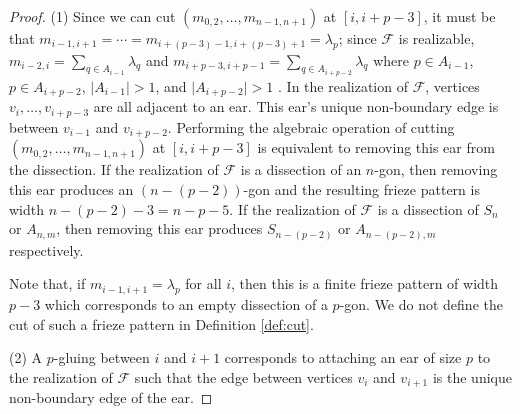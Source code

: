 \documentclass[12pt]{article}
\theoremstyle{remark}
\begin{document}
\begin{proof}
(1) Since we can cut $(m_{0,2},\ldots,m_{n-1,n+1})$ at $[i,i+p-3]$, it must be that $m_{i-1,i+1} = \cdots = m_{i+(p-3) -1, i+(p-3)+1} = \lambda_p$; since $\mathcal{F}$ is realizable, $m_{i-2,i} = \sum_{q \in A_{i-1}} \lambda_q$ and $m_{i+p-3,i+p-1} = \sum_{q \in A_{i+p-2}} \lambda_q$ where $p \in A_{i-1}$, $p \in A_{i+p-2}$, $\vert A_{i-1} \vert > 1$, and $\vert A_{i+p-2} \vert > 1$ . In the realization of $\mathcal{F}$, vertices $v_i,\ldots,v_{i+p-3}$ are all adjacent to an ear. This ear's unique non-boundary edge is between $v_{i-1}$ and $v_{i+p-2}$. Performing the algebraic operation of cutting $(m_{0,2},\ldots,m_{n-1,n+1})$ at $[i,i+p-3]$ is equivalent to removing this ear from the dissection. If the realization of $\mathcal{F}$ is a dissection of an $n$-gon, then removing this ear produces an $(n - (p-2))$-gon and the resulting frieze pattern is width $n - (p-2)-3 = n-p-5$. If the realization of $\mathcal{F}$ is a dissection of $S_n$ or $A_{n,m}$, then removing this ear produces $S_{n-(p-2)}$ or $A_{n - (p-2),m}$ respectively. 

Note that, if $m_{i-1,i+1} = \lambda_p$ for all $i$, then this is a finite frieze pattern of width $p-3$ which corresponds to an empty dissection of a $p$-gon. We do not define the cut of such a frieze pattern in Definition \ref{def:cut}.

(2) A $p$-gluing between $i$ and $i+1$ corresponds to attaching an ear of size $p$ to the realization of $\mathcal{F}$ such that the edge between vertices $v_i$ and $v_{i+1}$ is the unique non-boundary edge of the ear.
\end{proof}
\end{document}
